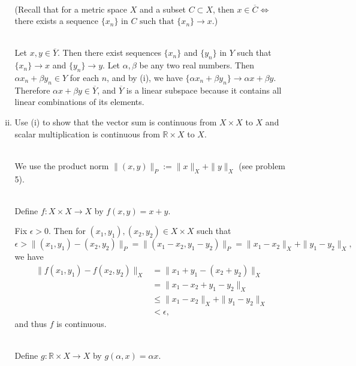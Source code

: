 \begin{enumerate}
\begin{enumerate}[(i)]
        \ \\(Recall that for a metric space $X$ and a subset $C\subset X$, then $x\in\overline{C}\iff$ there exists a sequence $\{x_n\}\text{ in }C\text{ such that }\{x_n\}\to x$.)
        
        \ \\Let $x,y\in\overline{Y}$.
        Then there exist sequences $\{x_n\}$ and $\{y_n\}$ in $Y$ such that $\{x_n\}\to x$ and $\{y_n\}\to y$.
        Let $\alpha,\beta$ be any two real numbers.
        Then $\alpha x_n+\beta y_n\in Y$ for each $n$, and by (i), we have $\{\alpha x_n+\beta y_n\}\to\alpha x+\beta y$. 
        Therefore $\alpha x+\beta y\in\overline{Y}$, and $\overline{Y}$ is a linear subspace because it contains all linear combinations of its elements.
        \\\item Use (i) to show that the vector sum is continuous from $X\times X$ to $X$ and scalar multiplication is continuous from $\mathbb{R}\times X$ to $X$.

        \ \\We use the product norm $\|(x,y)\|_P:=\|x\|_X+\|y\|_X$ (see problem 5).
        
        \ \\Define $f:X\times X\to X$ by $f(x,y)=x+y$.
        
        Fix $\epsilon>0$. 
        Then for $(x_1,y_1),(x_2,y_2)\in X\times X$ such that 
        \[
           \epsilon> \|(x_1,y_1)-(x_2,y_2)\|_P=\|(x_1-x_2,y_1-y_2)\|_P=\|x_1-x_2\|_X+\|y_1-y_2\|_X,
        \]
        we have
        \[
            \begin{split}
            \|f(x_1,y_1)-f(x_2,y_2)\|_X
            &=\|x_1+y_1-(x_2+y_2)\|_X\\
            &=\|x_1-x_2+y_1-y_2\|_X\\
            &\le\|x_1-x_2\|_X+\|y_1-y_2\|_X\\
            &<\epsilon,
            \end{split}
        \]
        and thus $f$ is continuous.

        \ \\Define $g:\mathbb{R}\times X\to X$ by $g(\alpha,x)=\alpha x$.
        

\end{enumerate}
\end{enumerate}

